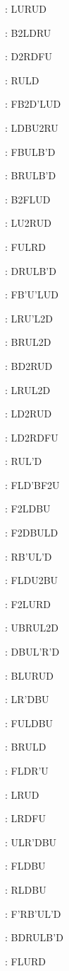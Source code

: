 \documentclass[9pt]{article}
\begin{document}
{\begin{multicols}{6}
: LURUD

: B2LDRU

: D2RDFU

: RULD

: FB2D'LUD

: LDBU2RU

: FBULB'D

: BRULB'D

: B2FLUD

: LU2RUD

: FULRD

: DRULB'D

: FB'U'LUD

: LRU'L2D

: BRUL2D

: BD2RUD

: LRUL2D

: LD2RUD

: LD2RDFU

: RUL'D

: FLD'BF2U

: F2LDBU

: F2DBULD

: RB'UL'D

: FLDU2BU

: F2LURD

: UBRUL2D

: DBUL'R'D

: BLURUD

: LR'DBU

: FULDBU

: BRULD

: FLDR'U

: LRUD

: LRDFU

: ULR'DBU

: FLDBU

: RLDBU

: F'RB'UL'D

: BDRULB'D

: FLURD


\end{multicols}}
\end{document}
